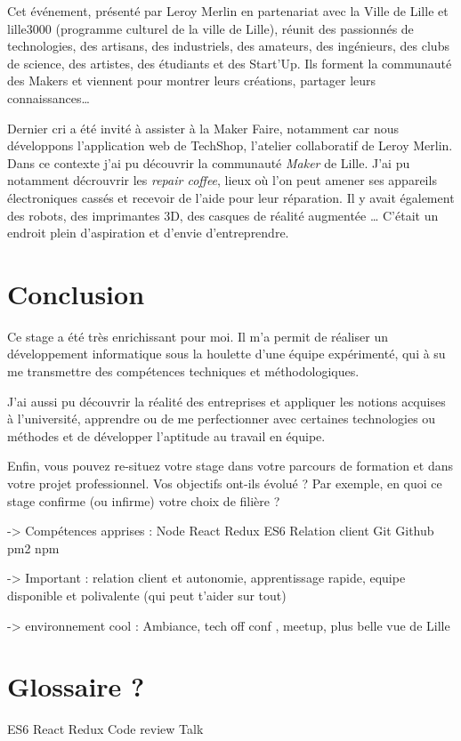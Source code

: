 \documentclass[12pt,a4paper]{article}
\begin{document}
  \bigskip

  Cet événement, présenté par Leroy Merlin en partenariat avec la Ville de
  Lille et lille3000 (programme culturel de la ville de Lille), réunit des
  passionnés de technologies, des artisans, des industriels, des amateurs,
  des ingénieurs, des clubs de science, des artistes, des étudiants et des
  Start'Up. Ils forment la communauté des Makers et viennent pour montrer
  leurs créations, partager leurs connaissances\ldots{}

  \bigskip

  Dernier cri a été invité à assister à la Maker Faire, notamment car nous
  développons l'application web de TechShop, l'atelier collaboratif de
  Leroy Merlin. Dans ce contexte j'ai pu découvrir la communauté
  \emph{Maker} de Lille. J'ai pu notamment décrouvrir les \emph{repair
  coffee}, lieux où l'on peut amener ses appareils électroniques cassés et
  recevoir de l'aide pour leur réparation. Il y avait également des
  robots, des imprimantes 3D, des casques de réalité augmentée \ldots{}
  C'était un endroit plein d'aspiration et d'envie d'entreprendre.

  \newpage

  \section{Conclusion}\label{conclusion-2}

  Ce stage a été très enrichissant pour moi. Il m'a permit de réaliser un
  développement informatique sous la houlette d'une équipe expérimenté,
  qui à su me transmettre des compétences techniques et méthodologiques.

  J'ai aussi pu découvrir la réalité des entreprises et appliquer les
  notions acquises à l'université, apprendre ou de me perfectionner avec
  certaines technologies ou méthodes et de développer l'aptitude au
  travail en équipe.

  Enfin, vous pouvez re-situez votre stage dans votre parcours de
  formation et dans votre projet professionnel. Vos objectifs ont-ils
  évolué ? Par exemple, en quoi ce stage confirme (ou infirme) votre choix
  de filière ?

  -\textgreater{} Compétences apprises : Node React Redux ES6 Relation
  client Git Github pm2 npm

  -\textgreater{} Important : relation client et autonomie, apprentissage
  rapide, equipe disponible et polivalente (qui peut t'aider sur tout)

  -\textgreater{} environnement cool : Ambiance, tech off conf , meetup,
  plus belle vue de Lille

  \newpage

  \section{Glossaire ?}\label{glossaire}

  ES6 React Redux Code review Talk
\end{document}
